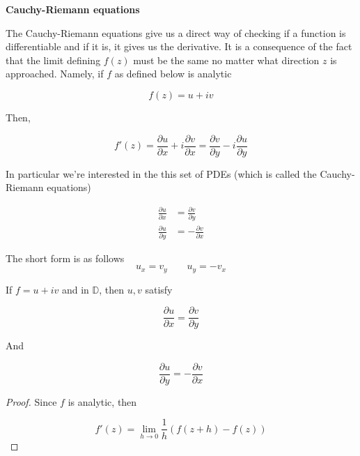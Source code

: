 \documentclass[../notes.tex]{subfiles}
\begin{document}
\begin{theorem}
	\textbf{ Cauchy-Riemann equations}

	The Cauchy-Riemann equations give us a direct way of checking if a function is differentiable and if it is, it gives us the derivative.
	It is a consequence of the fact that the limit defining $ f(z) $ must be the same no matter what direction $ z $ is approached.
	Namely, if $ f $ as defined below is analytic

	\begin{equation}
		f(z) = u + iv
	\end{equation}

	Then,

	\begin{equation}
		f'(z) = \frac{\partial u}{\partial x}  + i\frac{\partial v}{\partial x}  = \frac{\partial v}{\partial y} - i \frac{\partial u}{\partial y} 
	\end{equation}

	In particular we're interested in the this set of PDEs (which is called the Cauchy-Riemann equations)

	\begin{equation}
		\begin{split}
			\frac{\partial u}{\partial x} &= \frac{\partial v}{\partial y}\\
			\frac{\partial u}{\partial y} &= - \frac{\partial v}{\partial x}
		\end{split}
	\end{equation}

	The short form is as follows
	\begin{equation}
		u_x = v_y \qquad u_y = -v_x
	\end{equation}
	
	

	If $ f = u+iv $ and in $ \mathbb{D} $, then $ u, v $ satisfy

	\begin{equation}
		\frac{\partial u}{\partial x} = \frac{\partial v}{\partial y} 
	\end{equation}

	And

	\begin{equation}
		\frac{\partial u}{\partial y}  = - \frac{\partial v}{\partial x} 
	\end{equation}

	\begin{proof}
		Since $ f $ is analytic, then


		\begin{equation}
			f'(z) = \lim_{h \to 0} \frac{1}{h} (f(z+h) - f(z)) 
			\label{eq:389:l4ex3}
		\end{equation}


\end{proof}
\end{theorem}
\end{document}
